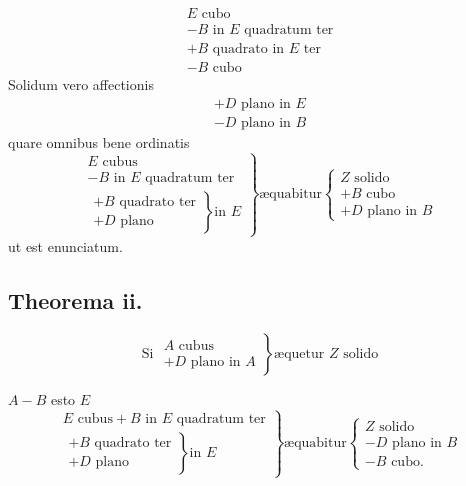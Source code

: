 \documentclass[11pt,a4paper]{article}
\begin{document}
\[ \begin{array}{l} E \text{ cubo} \\ - B \text{ in } E \text{ quadratum ter} \\ + B \text{ quadrato in } E \text{ ter} \\ - B \text{ cubo} \end{array} \]
Solidum vero affectionis
\[ \begin{array}{l} + D \text{ plano in } E \\ - D \text{ plano in } B \end{array} \]
quare omnibus bene ordinatis
\[ \left.\begin{array}{l} E \text{ cubus} \\ - B \text{ in } E \text{ quadratum ter} \\ \left.\begin{array}{l} + B \text{ quadrato ter} \\ + D \text{ plano} \end{array}\right\} \text{in } E \end{array}\right\} \text{æquabitur} \left\{\begin{array}{l} Z \text{ solido} \\ + B \text{ cubo} \\ + D \text{ plano in } B \end{array}\right. \]
ut est enunciatum.

\subsection*{Theorema ii.}

\[ \text{Si } \left.\begin{array}{l} A \text{ cubus} \\ + D \text{ plano in } A \end{array}\right\} \text{æquetur } Z \text{ solido} \]

$A - B$ esto $E$
\[ \left.\begin{array}{l} E \text{ cubus} + B \text{ in } E \text{ quadratum ter} \\ \left.\begin{array}{l} + B \text{ quadrato ter} \\ + D \text{ plano} \end{array}\right\} \text{in } E \end{array}\right\} \text{æquabitur} \left\{\begin{array}{l} Z \text{ solido} \\ - D \text{ plano in } B \\ - B \text{ cubo.} \end{array}\right. \]
\end{document}
